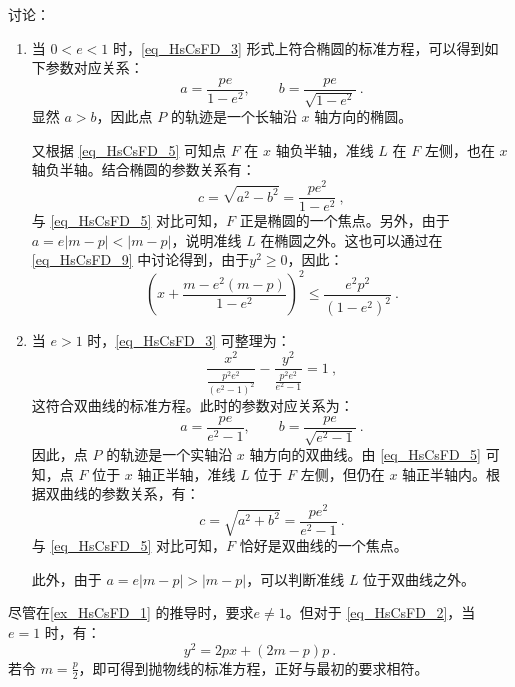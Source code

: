 \begin{example}
讨论：
\begin{enumerate}
\item 当 $0 < e < 1$ 时，\autoref{eq_HsCsFD_3} 形式上符合椭圆的标准方程，可以得到如下参数对应关系：
\begin{equation}
a = \frac{p e}{1 - e^2}, \qquad b = \frac{p e}{\sqrt{1 - e^2}}~.
\end{equation}
显然 $a > b$，因此点 $P$ 的轨迹是一个长轴沿 $x$ 轴方向的椭圆。

又根据 \autoref{eq_HsCsFD_5} 可知点 $F$ 在 $x$ 轴负半轴，准线 $L$ 在 $F$ 左侧，也在 $x$ 轴负半轴。结合椭圆的参数关系有：
\begin{equation}\label{eq_HsCsFD_6}
c = \sqrt{a^2 - b^2} = \frac{p e^2}{1 - e^2}~,
\end{equation}
与 \autoref{eq_HsCsFD_5} 对比可知，$F$ 正是椭圆的一个焦点。另外，由于 $a = e |m - p| < |m - p|$，说明准线 $L$ 在椭圆之外。这也可以通过在\autoref{eq_HsCsFD_9} 中讨论得到，由于$y^2\geq0$，因此：
\begin{equation}
\left(x+\frac{m-e^2(m-p)}{1-e^2}\right)^2 \leq \frac{e^2 p^2}{(1 - e^2)^2}~.
\end{equation}


\item 当 $e > 1$ 时，\autoref{eq_HsCsFD_3} 可整理为：
\begin{equation}
\frac{x^2}{\displaystyle\frac{p^2 e^2}{(e^2 - 1)^2}} - \frac{y^2}{\displaystyle\frac{p^2 e^2}{e^2 - 1}} = 1~,
\end{equation}
这符合双曲线的标准方程。此时的参数对应关系为：
\begin{equation}
a = \frac{p e}{e^2 - 1}, \qquad b = \frac{p e}{\sqrt{e^2 - 1}}~.
\end{equation}
因此，点 $P$ 的轨迹是一个实轴沿 $x$ 轴方向的双曲线。由 \autoref{eq_HsCsFD_5} 可知，点 $F$ 位于 $x$ 轴正半轴，准线 $L$ 位于 $F$ 左侧，但仍在 $x$ 轴正半轴内。根据双曲线的参数关系，有：
\begin{equation}
c = \sqrt{a^2 + b^2} = \frac{p e^2}{e^2 - 1}~.
\end{equation}
与 \autoref{eq_HsCsFD_5} 对比可知，$F$ 恰好是双曲线的一个焦点。

此外，由于 $a = e |m - p| > |m - p|$，可以判断准线 $L$ 位于双曲线之外。
\end{enumerate}
\end{example}

尽管在\autoref{ex_HsCsFD_1} 的推导时，要求$e\neq1$。但对于 \autoref{eq_HsCsFD_2}，当 $e = 1$ 时，有：
\begin{equation}
y^2 = 2px + (2m - p)p~.
\end{equation}
若令 $\displaystyle m = \frac{p}{2}$，即可得到抛物线的标准方程，正好与最初的要求相符。

